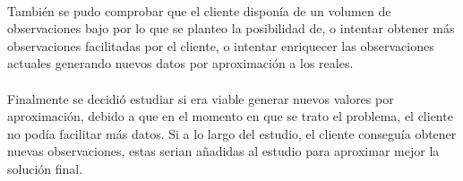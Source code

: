 \paragraph{}
También se pudo comprobar que el cliente disponía de un volumen de observaciones bajo por lo que se planteo la posibilidad de, o intentar obtener más observaciones facilitadas por el cliente, o intentar enriquecer las observaciones actuales generando nuevos datos por aproximación a los reales.

\paragraph{}
Finalmente se decidió estudiar si era viable generar nuevos valores por aproximación, debido a que en el momento en que se trato el problema, el cliente no podía facilitar más datos. Si a lo largo del estudio, el cliente conseguía obtener nuevas observaciones, estas serian añadidas al estudio para aproximar mejor la solución final.



